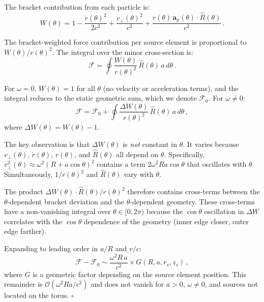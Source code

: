 \documentclass[12pt,preprint,amsmath,amssymb]{revtex4-2}
\begin{document}
The bracket contribution from each particle is:
\begin{equation}
W(\theta) = 1 - \frac{\dot{r}(\theta)^2}{2c^2} + \frac{v_\perp(\theta)^2}{c^2}
  + \frac{r(\theta)\,\mathbf{a}_p(\theta) \cdot \hat{R}(\theta)}{c^2}\,.
\end{equation}

The bracket-weighted force contribution per source element is proportional to
$W(\theta)/r(\theta)^2$. The integral over the minor cross-section is:
\begin{equation}
\label{eq:integral}
\mathcal{F} = \oint \frac{W(\theta)}{r(\theta)^2}\,\hat{R}(\theta)\,a\,d\theta\,.
\end{equation}

For $\omega = 0$, $W(\theta) = 1$ for all $\theta$ (no velocity or acceleration terms),
and the integral reduces to the static geometric sum, which we denote $\mathcal{F}_0$.
For $\omega \neq 0$:
\begin{equation}
\mathcal{F} = \mathcal{F}_0 + \oint \frac{\Delta W(\theta)}{r(\theta)^2}\,\hat{R}(\theta)\,a\,d\theta\,,
\end{equation}
where $\Delta W(\theta) = W(\theta) - 1$.

The key observation is that $\Delta W(\theta)$ is \emph{not} constant in $\theta$.
It varies because $v_\perp(\theta)$, $\dot{r}(\theta)$, $r(\theta)$, and $\hat{R}(\theta)$
all depend on $\theta$. Specifically, $v_\perp^2(\theta) \approx \omega^2(R + a\cos\theta)^2$
contains a term $2\omega^2 R a \cos\theta$ that oscillates with $\theta$.
Simultaneously, $1/r(\theta)^2$ and $\hat{R}(\theta)$ vary with $\theta$.

The product $\Delta W(\theta) \cdot \hat{R}(\theta) / r(\theta)^2$ therefore contains
cross-terms between the $\theta$-dependent bracket deviation and the $\theta$-dependent
geometry. These cross-terms have a non-vanishing integral over $\theta \in [0, 2\pi)$
because the $\cos\theta$ oscillation in $\Delta W$ correlates with the $\cos\theta$
dependence of the geometry (inner edge closer, outer edge farther).

Expanding to leading order in $a/R$ and $v/c$:
\begin{equation}
\mathcal{F} - \mathcal{F}_0 \sim \frac{\omega^2 R\, a}{c^2} \times G(R, a, r_s, z_s)\,,
\end{equation}
where $G$ is a geometric factor depending on the source element position.
This remainder is $\mathcal{O}(\omega^2 R a / c^2)$ and does not vanish for $a > 0$,
$\omega \neq 0$, and sources not located on the torus. \hfill $\square$
\end{document}
